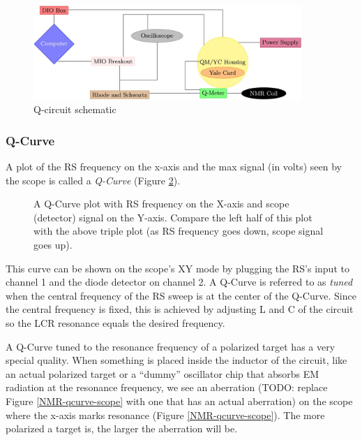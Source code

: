 \begin{figure}
	\centering
	\includegraphics[width=4in,angle=0]{img/NMR-q-circuit-schematic.jpg}
	\caption{Q-circuit schematic}
	\label{NMR-q-circuit-schematic}
\end{figure}
\subsubsection{Q-Curve}
A plot of the RS frequency on the x-axis and the max signal (in volts) seen by the scope is called a \textit{Q-Curve} (Figure \ref{qcurve-tikz}).

\begin{figure}
  \centering
  \caption{A Q-Curve plot with RS frequency on the X-axis and scope (detector) signal on the Y-axis.  Compare the left half of this plot with the above triple plot (as RS frequency goes down, scope signal goes up).}
  \label{qcurve-tikz}
\end{figure}

This curve can be shown on the scope's XY mode by plugging the RS's input to channel 1 and the diode detector on channel 2. A Q-Curve is referred to as \textit{tuned} when the central frequency of the RS sweep is at the center of the Q-Curve.  Since the central frequency is fixed, this is achieved by adjusting L and C of the circuit so the LCR resonance equals the desired frequency. 


A Q-Curve tuned to the resonance frequency of a polarized target has a very special quality.  When something is placed inside the inductor of the circuit, like an actual polarized target or a ``dummy'' oscillator chip that absorbs EM radiation at the resonance frequency, we see an aberration (TODO: replace Figure \ref{NMR-qcurve-scope} with one that has an actual aberration) on the scope where the x-axis marks resonance (Figure \ref{NMR-qcurve-scope}).  The more polarized a target is, the larger the aberration will be.\\

